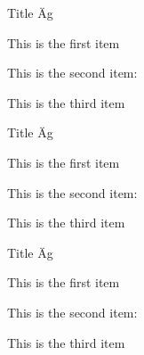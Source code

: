 \documentclass[a4paper, 10pt]{extarticle}
\begin{document}
\lipsum[1]
\begin{fancyblock}[blue]{Title \"Ag}
\begin{fancylist}
\item This is the first item
\item This is the second item: \lipsum[1]
\item This is the third item
\end{fancylist}
\end{fancyblock}
\begin{fancyblock*}[blue]{Title \"Ag}
\begin{fancylist}
\item This is the first item
\item This is the second item: \lipsum[1]
\item This is the third item
\end{fancylist}
\end{fancyblock*}
\begin{fancyblock+}[blue]{Title \"Ag}
\begin{fancylist}
\item This is the first item
\item This is the second item: \lipsum[1]
\item This is the third item
\end{fancylist}
\end{fancyblock+}
\lipsum[1]
\end{document}
